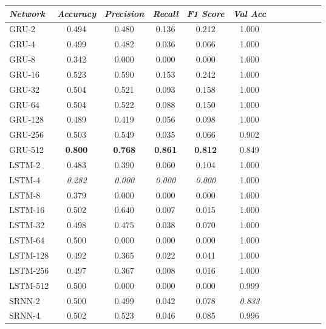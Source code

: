 \begin{table}[t]
\begin{tabularx}{\textwidth}{@{}l*{10}{C}c@{}}
 \toprule
  \textit{Network} &  \textit{Accuracy} &  \textit{Precision} &  \textit{Recall} &  \textit{F1 Score} &  \textit{Val Acc} \\
 \midrule
    GRU-2 &     0.494 &      0.480 &   0.136 &     0.212 &    1.000 \\
    GRU-4 &     0.499 &      0.482 &   0.036 &     0.066 &    1.000 \\
    GRU-8 &     0.342 &      0.000 &   0.000 &     0.000 &    1.000 \\
   GRU-16 &     0.523 &      0.590 &   0.153 &     0.242 &    1.000 \\
   GRU-32 &     0.504 &      0.521 &   0.093 &     0.158 &    1.000 \\
   GRU-64 &     0.504 &      0.522 &   0.088 &     0.150 &    1.000 \\
  GRU-128 &     0.489 &      0.419 &   0.056 &     0.098 &    1.000 \\
  GRU-256 &     0.503 &      0.549 &   0.035 &     0.066 &    0.902 \\
  GRU-512 &     \textbf{0.800} &      \textbf{0.768} &   \textbf{0.861} &     \textbf{0.812} &    0.849 \\
   LSTM-2 &     0.483 &      0.390 &   0.060 &     0.104 &    1.000 \\
   LSTM-4 &     \textit{0.282} &      \textit{0.000} &   \textit{0.000} &     \textit{0.000} &    1.000 \\
   LSTM-8 &     0.379 &      0.000 &   0.000 &     0.000 &    1.000 \\
  LSTM-16 &     0.502 &      0.640 &   0.007 &     0.015 &    1.000 \\
  LSTM-32 &     0.498 &      0.475 &   0.038 &     0.070 &    1.000 \\
  LSTM-64 &     0.500 &      0.000 &   0.000 &     0.000 &    1.000 \\
 LSTM-128 &     0.492 &      0.365 &   0.022 &     0.041 &    1.000 \\
 LSTM-256 &     0.497 &      0.367 &   0.008 &     0.016 &    1.000 \\
 LSTM-512 &     0.500 &      0.000 &   0.000 &     0.000 &    0.999 \\
   SRNN-2 &     0.500 &      0.499 &   0.042 &     0.078 &    \textit{0.833} \\
   SRNN-4 &     0.502 &      0.523 &   0.046 &     0.085 &    0.996 \\

\end{tabularx}
\end{table}
